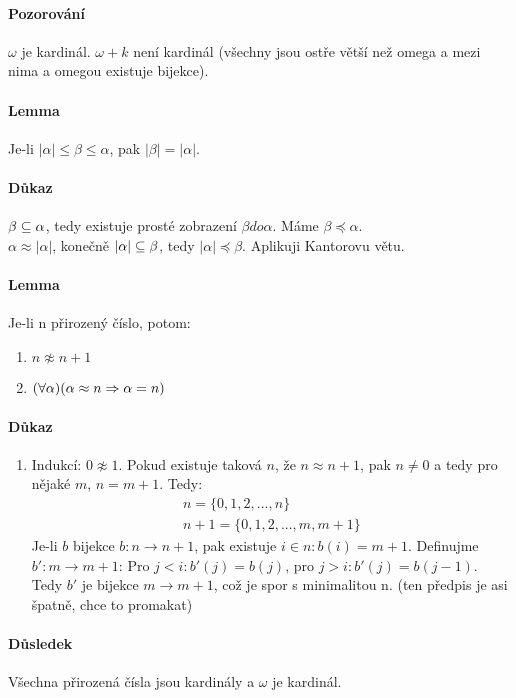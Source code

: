 \documentclass[a4paper,12pt,titlepage]{article}
\begin{document}
\paragraph{Pozorování}
$\omega$ je kardinál. $\omega + k$ není kardinál (všechny jsou ostře větší než
omega a mezi nima a omegou existuje bijekce).
\paragraph{Lemma}
 Je-li $|\alpha| \le \beta \le \alpha$, pak $|\beta| = |\alpha|$.
\paragraph{Důkaz}
$\beta\subseteq \alpha$, tedy existuje prosté zobrazení $\beta do \alpha$. Máme
$\beta \preceq \alpha$. \\
$\alpha \approx |\alpha|$, konečně $|\alpha| \subseteq \beta$, tedy $|\alpha| \preceq
\beta$. Aplikuji Kantorovu větu.
\paragraph{Lemma}
Je-li n přirozený číslo, potom:
\begin{enumerate}
	\item $n \napprox n+1$
	\item $(\forall \alpha)(\alpha \approx n \Rightarrow \alpha = n)$
\end{enumerate}
\paragraph{Důkaz}
\begin{enumerate}
	\item Indukcí: $0 \napprox 1$. Pokud existuje taková $n$, že $n\approx n+1$,
	pak $n \neq 0$ a tedy pro nějaké $m$, $n = m+1$. Tedy:
	\begin{align}
		n = \{0, 1, 2, ..., n\} \\
		n+1 = \{0, 1, 2, ..., m, m+1 \}
	\end{align}
	Je-li $b$ bijekce $b: n \to n+1$, pak existuje $i \in n: b(i) = m+1$.
	Definujme $b': m \to m+1$: Pro $j < i: b'(j) = b(j)$, pro $j > i: b'(j) =
	b(j-1)$. Tedy $b'$ je bijekce $m\to m+1$, což je spor s minimalitou n. (ten
	předpis je asi špatně, chce to promakat)
\end{enumerate}
\paragraph{Důsledek}
Všechna přirozená čísla jsou kardinály a $\omega$ je kardinál.
\end{document}
